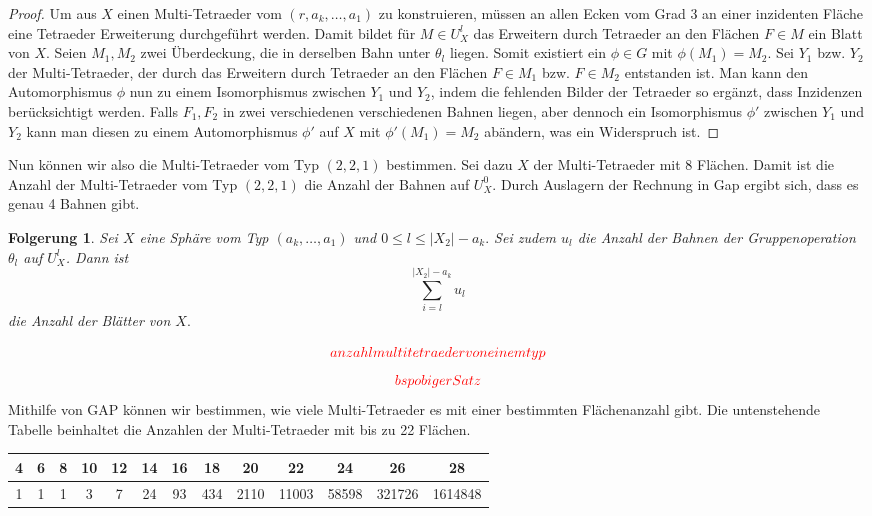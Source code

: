 \documentclass[12pt,titlepage,twoside,cleardoublepage]{article}
\theoremstyle{nummermitklammern}
\newtheorem{folgerung}[temp]{Folgerung}
\newtheorem{folgerung}[zahl]{Folgerung}
\numberwithin{equation}{section}
\begin{document}
\begin{proof}
Um aus $X$ einen Multi-Tetraeder vom $(r,a_k,\ldots,a_1)$ zu konstruieren, müssen an allen Ecken vom Grad 3 an einer inzidenten Fläche eine Tetraeder Erweiterung durchgeführt werden. Damit bildet für $M\in U_X^l$ das Erweitern durch Tetraeder an den Flächen $F\in M$ ein Blatt von $X$. Seien $M_1,M_2$ zwei Überdeckung, die in derselben Bahn unter $\theta_l$ liegen. Somit existiert ein $\phi \in G$ mit $\phi(M_1)=M_2.$ Sei $Y_1$ bzw. $Y_2$ der Multi-Tetraeder, der durch das Erweitern durch Tetraeder an den Flächen $F\in M_1$ bzw. $F \in M_2$ entstanden ist. Man kann den Automorphismus $\phi$ nun zu einem Isomorphismus zwischen $Y_1$ und $Y_2$, indem die fehlenden Bilder der Tetraeder so ergänzt, dass Inzidenzen berücksichtigt werden. Falls $F_1,F_2$ in zwei verschiedenen verschiedenen Bahnen liegen, aber dennoch ein Isomorphismus $\phi'$ zwischen $Y_1$ und $Y_2$ kann man diesen zu einem Automorphismus $\phi'$ auf $X$ mit $\phi'(M_1)=M_2$ abändern, was ein Widerspruch ist.
\end{proof}
Nun können wir also die Multi-Tetraeder vom Typ $(2,2,1)$ bestimmen. Sei dazu $X$ der Multi-Tetraeder mit 8 Flächen.
Damit ist die Anzahl der Multi-Tetraeder vom Typ $(2,2,1)$ die Anzahl der Bahnen auf $U^0_X.$ Durch Auslagern der Rechnung in Gap ergibt sich, dass es genau 4 Bahnen gibt.
\begin{folgerung}
Sei $X$ eine Sphäre vom Typ $(a_k,\ldots, a_1)$ und $0\leq l\leq \vert X_2\vert -a_k.$ Sei zudem $u_l$ die Anzahl der Bahnen der Gruppenoperation $\theta_l$ auf $U_X^l$. Dann ist 
\[
\sum_{i=l}^{\vert X_2\vert -a_k} u_l
\] die Anzahl der Blätter von $X.$
\end{folgerung}
\[
\textcolor{red}{anzahl multitetraeder von einem typ}
\]
\[
\textcolor{red}{bsp obiger Satz}
\]
Mithilfe von GAP können wir bestimmen, wie viele Multi-Tetraeder es mit einer bestimmten Flächenanzahl gibt.
Die untenstehende Tabelle beinhaltet die Anzahlen der Multi-Tetraeder mit bis zu 22 Flächen.
\begin{center}
\begin{tabular}[h]{|c|c|c|c|c|c|c|c|c|c|c|c|c|}
\hline
\textbf{ 4} &  \textbf{6}& \textbf{8} &\textbf{ 10} &\textbf{ 12} & \textbf{14}&\textbf{16}&\textbf{18}&\textbf{20}&\textbf{22}&\textbf{24}&\textbf{26}&\textbf{28}\\
\hline
 1& 1& 1& 3& 7& 24& 93& 434& 2110& 11003& 58598& 321726& 1614848
 \\
 \hline
\end{tabular}
\end{center}
\end{document}
